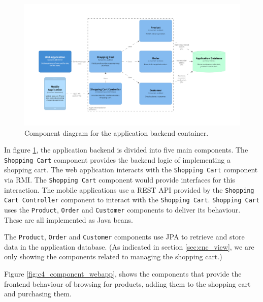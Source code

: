 \begin{figure}[h!]
    \centering
    \begin{adjustwidth}{-5mm}{-5mm}
        \includegraphics[trim=190 185 197 198,clip,width=0.92\paperwidth]{images/c4/appbackend_component_diagram.png}
    \end{adjustwidth}
    \caption{Component diagram for the application backend container.}
    \label{fig:c4_component_appbackend}
\end{figure}

In figure \ref{fig:c4_component_appbackend}, the application backend is divided into five main components.
The \texttt{Shopping Cart} component provides the backend logic of implementing a shopping cart.
The web application interacts with the \texttt{Shopping Cart} component via RMI.
The \texttt{Shopping Cart} component would provide interfaces for this interaction.
The mobile applications use a REST API provided by the \texttt{Shopping Cart Controller} component to interact with the \texttt{Shopping Cart}.
\texttt{Shopping Cart} uses the \texttt{Product}, \texttt{Order} and \texttt{Customer} components to deliver its behaviour.
These are all implemented as Java beans.

The \texttt{Product}, \texttt{Order} and \texttt{Customer} components use JPA to retrieve and store data in the application database.
(As indicated in section \ref{sec:cnc_view}, we are only showing the components related to managing the shopping cart.)

\pagebreak
\noindent
Figure \ref{fig:c4_component_webapp}, shows the components that provide the frontend behaviour
of browsing for products, adding them to the shopping cart and purchasing them.

